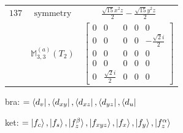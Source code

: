\documentclass[fleqn,8pt,landscape]{jsarticle}
\begin{document}
\begin{longtable}{ccc}
$ 137 $ & $ \text{symmetry} $ & $ \frac{\sqrt{15} x^{2} z}{2} - \frac{\sqrt{15} y^{2} z}{2} $ \\
$  $ & $ \mathbb{M}_{3,3}^{(a)}(T_{2}) $ & $ \begin{bmatrix} 0 & 0 & 0 & 0 & 0 \\ 0 & 0 & 0 & 0 & - \frac{\sqrt{2} i}{2} \\ 0 & 0 & 0 & 0 & 0 \\ 0 & 0 & 0 & 0 & 0 \\ 0 & \frac{\sqrt{2} i}{2} & 0 & 0 & 0 \end{bmatrix} $ \\ \hline
\end{longtable}
bra: $=\bra{d_{v}}, \bra{d_{xy}}, \bra{d_{xz}}, \bra{d_{yz}}, \bra{d_{u}}$

\noindent
ket: $=\ket{f_{c}}, \ket{f_{s}}, \ket{f_{z}^{\beta}}, \ket{f_{xyz}}, \ket{f_{x}}, \ket{f_{y}}, \ket{f_{z}^{\alpha}}$
\renewcommand{\arraystretch}{1.6}
\end{document}
